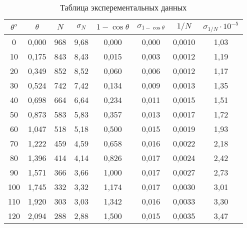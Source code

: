 \begin{table}[h!]
    \centering
    \begin{tabular}{|c|c|c|c|c|c|c|c|}
    \hline
    $\theta^o$   & $\theta$ & $N$   & $\sigma_N$ & $1 - \cos \theta$ & $\sigma_{1-\cos \theta}$ & $1/N$    & $\sigma_{1/N} \cdot 10^{-5}$ \\ \hline
    0            & 0,000    & 968   & 9,68       & 0,000             & 0,000                    & 0,0010   & 1,03                            \\ \hline
    10           & 0,175    & 843   & 8,43       & 0,015             & 0,003                    & 0,0012   & 1,19                            \\ \hline
    20           & 0,349    & 852   & 8,52       & 0,060             & 0,006                    & 0,0012   & 1,17                            \\ \hline
    30           & 0,524    & 742   & 7,42       & 0,134             & 0,009                    & 0,0013   & 1,35                            \\ \hline
    40           & 0,698    & 664   & 6,64       & 0,234             & 0,011                    & 0,0015   & 1,51                            \\ \hline
    50           & 0,873    & 583   & 5,83       & 0,357             & 0,013                    & 0,0017   & 1,72                            \\ \hline
    60           & 1,047    & 518   & 5,18       & 0,500             & 0,015                    & 0,0019   & 1,93                            \\ \hline
    70           & 1,222    & 459   & 4,59       & 0,658             & 0,016                    & 0,0022   & 2,18                            \\ \hline
    80           & 1,396    & 414   & 4,14       & 0,826             & 0,017                    & 0,0024   & 2,42                            \\ \hline
    90           & 1,571    & 366   & 3,66       & 1,000             & 0,017                    & 0,0027   & 2,73                            \\ \hline
    100          & 1,745    & 332   & 3,32       & 1,174             & 0,017                    & 0,0030   & 3,01                            \\ \hline
    110          & 1,920    & 303   & 3,03       & 1,342             & 0,016                    & 0,0033   & 3,30                            \\ \hline
    120          & 2,094    & 288   & 2,88       & 1,500             & 0,015                    & 0,0035   & 3,47                            \\ \hline
    \end{tabular}
    \caption{Таблица эксперементальных данных}
    \label{tab:experement}
\end{table}